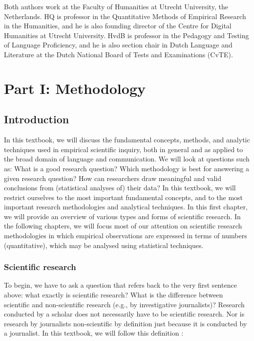 \documentclass[
]{book}
\begin{document}
Both authors work at the Faculty of Humanities at Utrecht University, the Netherlands.
HQ is professor in the Quantitative Methods of Empirical Research in the Humanities, and he is also founding director of the Centre for Digital Humanities at Utrecht University. HvdB is professor in the Pedagogy and Testing of Language Proficiency, and he is also section chair in Dutch Language and Literature at the Dutch National Board of Tests and Examinations (CvTE).

\hypertarget{part-part-i-methodology}{%
\part*{Part I: Methodology}\label{part-part-i-methodology}}

\hypertarget{ch-introduction}{%
\chapter{Introduction}\label{ch-introduction}}

In this textbook, we will discuss the fundamental concepts, methods, and analytic techniques used in empirical scientific inquiry, both in general and as applied to the broad domain of language and communication. We will look at questions such as: What is a good research question? Which methodology is best for answering a given research question? How can researchers draw meaningful and valid conclusions from (statistical analyses of) their data? In this textbook, we will restrict ourselves to the most important fundamental concepts, and to the most important research methodologies and analytical techniques. In this first chapter, we will provide an overview of various types and forms of scientific research. In the following chapters, we will focus most of our attention on scientific research methodologies in which empirical observations are expressed in terms of numbers (quantitative), which may be analysed using statistical techniques.

\hypertarget{sec:scientific-research}{%
\section{Scientific research}\label{sec:scientific-research}}

To begin, we have to ask a question that refers back to the very first sentence above: what exactly is scientific research? What is the difference between scientific and non-scientific research (e.g., by investigative journalists)? Research conducted by a scholar does not necessarily have to be scientific research. Nor is research by journalists non-scientific by definition just because it is conducted by a journalist. In this textbook, we will follow this definition \citep[p.14]{KL00}:
\end{document}
